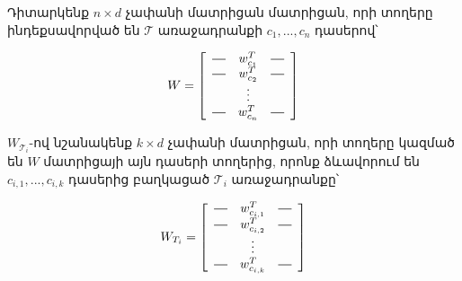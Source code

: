 \documentclass[12pt]{article}
\newcommand*{\horzbar}{\rule[.5ex]{2.5ex}{0.5pt}}
\begin{document}
 Դիտարկենք $n\times  d$  չափանի մատրիցան մատրիցան, որի տողերը ինդեքսավորված են $\mathcal{T}$ առաջադրանքի $c_1, ..., c_n$ դասերով՝ 

$$W = \left[
  \begin{array}{ccc}
    \horzbar & w^{T}_{c_1} & \horzbar \\
    \horzbar & w^{T}_{c_2} & \horzbar \\
             & \vdots    &          \\
    \horzbar & w^{T}_{c_{n}} & \horzbar
  \end{array}
\right]$$


$W_{\mathcal{T}_i}$-ով նշանակենք $k \times d$ չափանի մատրիցան, որի տողերը կազմած են $W$ մատրիցայի այն դասերի տողերից, որոնք ձևավորում են  $c_{i,1}, ..., c_{i,k}$ դասերից բաղկացած $\mathcal{T}_i$ առաջադրանքը՝

$$W_{T_i} = \left[
  \begin{array}{ccc}
    \horzbar & w^{T}_{c_{i,1}} & \horzbar \\
    \horzbar & w^{T}_{c_{i, 2}} & \horzbar \\
             & \vdots    &          \\
    \horzbar & w^{T}_{c_{{i, k}}} & \horzbar
  \end{array}
\right]$$
\end{document}
